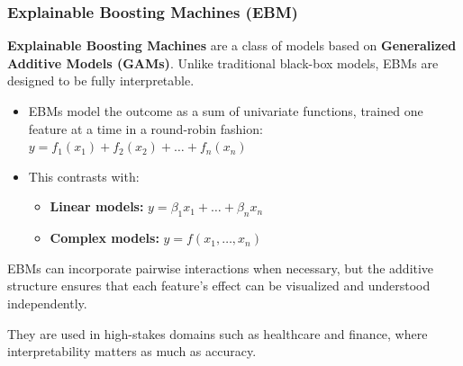 \subsubsection{Explainable Boosting Machines (EBM)}

\textbf{Explainable Boosting Machines} are a class of models based on \textbf{Generalized Additive Models (GAMs)}. Unlike traditional black-box models, EBMs are designed to be fully interpretable.

\begin{itemize}
    \item EBMs model the outcome as a sum of univariate functions, trained one feature at a time in a round-robin fashion: $y = f_1(x_1) + f_2(x_2) + \dots + f_n(x_n)$
    
    \item This contrasts with:
    \begin{itemize}
        \item \textbf{Linear models:} \( y = \beta_1 x_1 + \dots + \beta_n x_n \)
        \item \textbf{Complex models:} \( y = f(x_1, \dots, x_n) \)
    \end{itemize}
\end{itemize}

EBMs can incorporate pairwise interactions when necessary, but the additive structure ensures that each feature's effect can be visualized and understood independently.

They are used in high-stakes domains such as healthcare and finance, where interpretability matters as much as accuracy.
